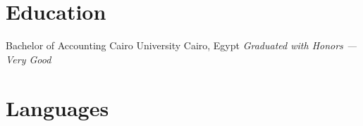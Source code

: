 \documentclass[11pt,a4paper,sans]{moderncv}
\begin{document}
\section{Education}
%
  {Bachelor of Accounting}%
  {Cairo University}%
  {Cairo, Egypt}%
  {\textit{Graduated with Honors --- Very Good}}{}

\section{Languages}
\end{document}
